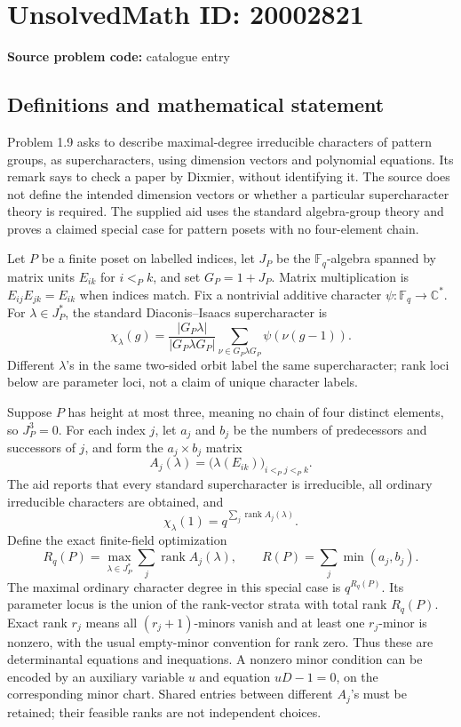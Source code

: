 \documentclass[11pt]{article}
\newcommand{\C}{\mathbb{C}}
\newcommand{\F}{\mathbb{F}}
\begin{document}
\section*{UnsolvedMath ID: 20002821}
\textbf{Source problem code:} catalogue entry
\subsection{Definitions and mathematical statement}
Problem 1.9 asks to describe maximal-degree irreducible characters of pattern groups, as supercharacters, using dimension vectors and polynomial equations. Its remark says to check a paper by Dixmier, without identifying it. The source does not define the intended dimension vectors or whether a particular supercharacter theory is required. The supplied aid uses the standard algebra-group theory and proves a claimed special case for pattern posets with no four-element chain.

Let \(P\) be a finite poset on labelled indices, let \(J_P\) be the \(\F_q\)-algebra spanned by matrix units \(E_{ik}\) for \(i<_Pk\), and set \(G_P=1+J_P\). Matrix multiplication is \(E_{ij}E_{jk}=E_{ik}\) when indices match. Fix a nontrivial additive character \(\psi:\F_q\to\C^*\). For \(\lambda\in J_P^*\), the standard Diaconis--Isaacs supercharacter is
\[
 \chi_\lambda(g)=\frac{|G_P\lambda|}{|G_P\lambda G_P|}
        \sum_{\nu\in G_P\lambda G_P}\psi(\nu(g-1)).
\]
Different \(\lambda\)'s in the same two-sided orbit label the same supercharacter; rank loci below are parameter loci, not a claim of unique character labels.

Suppose \(P\) has height at most three, meaning no chain of four distinct elements, so \(J_P^3=0\). For each index \(j\), let \(a_j\) and \(b_j\) be the numbers of predecessors and successors of \(j\), and form the \(a_j\times b_j\) matrix
\[
 A_j(\lambda)=\bigl(\lambda(E_{ik})\bigr)_{i<_Pj<_Pk}.
\]
The aid reports that every standard supercharacter is irreducible, all ordinary irreducible characters are obtained, and
\[
 \chi_\lambda(1)=q^{\sum_j\operatorname{rank}A_j(\lambda)}.
\]
Define the exact finite-field optimization
\[
 R_q(P)=\max_{\lambda\in J_P^*}
                  \sum_j\operatorname{rank}A_j(\lambda),\qquad
 R(P)=\sum_j\min(a_j,b_j).
\]
The maximal ordinary character degree in this special case is \(q^{R_q(P)}\). Its parameter locus is the union of the rank-vector strata with total rank \(R_q(P)\). Exact rank \(r_j\) means all \((r_j+1)\)-minors vanish and at least one \(r_j\)-minor is nonzero, with the usual empty-minor convention for rank zero. Thus these are determinantal equations and inequations. A nonzero minor condition can be encoded by an auxiliary variable \(u\) and equation \(uD-1=0\), on the corresponding minor chart. Shared entries between different \(A_j\)'s must be retained; their feasible ranks are not independent choices.
\end{document}
